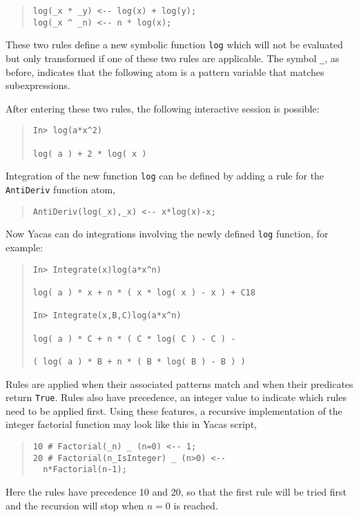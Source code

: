 \documentclass{llncs}
\begin{document}
\begin{quote}\small\begin{verbatim}
log(_x * _y) <-- log(x) + log(y);
log(_x ^ _n) <-- n * log(x);
\end{verbatim}\end{quote}
These two rules define a new symbolic function \texttt{log} which will not be evaluated
but only transformed if one of these two rules are applicable. The symbol \verb|_|, as before, indicates that the following atom is a pattern variable that matches subexpressions.


After entering these two rules, the following interactive session is possible:


\begin{quote}\small\begin{verbatim}
In> log(a*x^2)

log( a ) + 2 * log( x )
\end{verbatim}\end{quote}


Integration of the new function \texttt{log} can be defined by adding a rule for the
\texttt{AntiDeriv} function atom,


\begin{quote}\small\begin{verbatim}
AntiDeriv(log(_x),_x) <-- x*log(x)-x;
\end{verbatim}\end{quote}
Now Yacas can do integrations involving the newly defined \texttt{log} function, for example:


\begin{quote}\small\begin{verbatim}
In> Integrate(x)log(a*x^n)

log( a ) * x + n * ( x * log( x ) - x ) + C18

In> Integrate(x,B,C)log(a*x^n)

log( a ) * C + n * ( C * log( C ) - C ) -

( log( a ) * B + n * ( B * log( B ) - B ) )
\end{verbatim}\end{quote}


Rules are applied when their associated patterns match and when their
predicates return \texttt{True}. Rules also have precedence, an integer value
to indicate which rules need to be applied first. Using these features, a
recursive implementation of the integer factorial function may look like this
in Yacas script,


\begin{quote}\small\begin{verbatim}
10 # Factorial(_n) _ (n=0) <-- 1;
20 # Factorial(n_IsInteger) _ (n>0) <--
  n*Factorial(n-1);
\end{verbatim}\end{quote}
Here the rules have precedence 10 and 20, so that the first rule will be tried first and the recursion will stop when $n = 0$ is reached.
\end{document}
